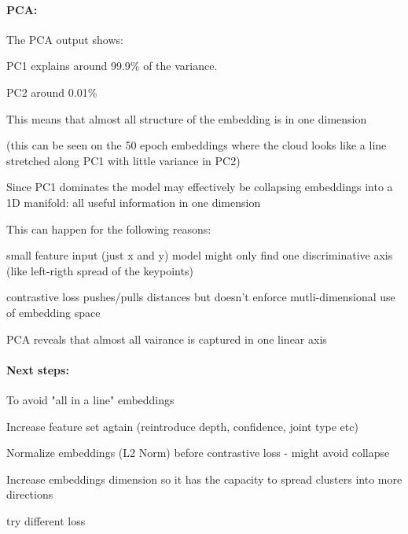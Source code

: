 \paragraph{PCA:} The PCA output shows:

\begin{compactitem}
  \item PC1 explains around 99.9\% of the variance.
  \item PC2 around 0.01\%
\end{compactitem}

This means that almost all structure of the embedding is in one dimension

(this can be seen on the 50 epoch embeddings where the cloud looks like a line stretched along PC1 with little variance in PC2)

Since PC1 dominates the model may effectively be collapsing embeddings into a 1D manifold: all useful information in one dimension

This can happen for the following reasons:

\begin{compactitem}
  \item small feature input (just x and y) model might only find one discriminative axis (like left-rigth spread of the keypoints)
  \item contrastive loss pushes/pulls distances but doesn't enforce mutli-dimensional use of embedding space 
  \item PCA reveals that almost all vairance is captured in one linear axis
\end{compactitem}


\paragraph{Next steps:} To avoid "all in a line" embeddings

\begin{compactitem}
  \item Increase feature set agtain (reintroduce depth, confidence, joint type etc)
  \item Normalize embeddings (L2 Norm) before contrastive loss - might avoid collapse 
  \item Increase embeddings dimension so it has the capacity to spread clusters into more directions
  \item try different loss 
\end{compactitem}


\renewcommand{\runid}{0211e02a-4fc1-414f-b7c9-9a8135507ca1}

